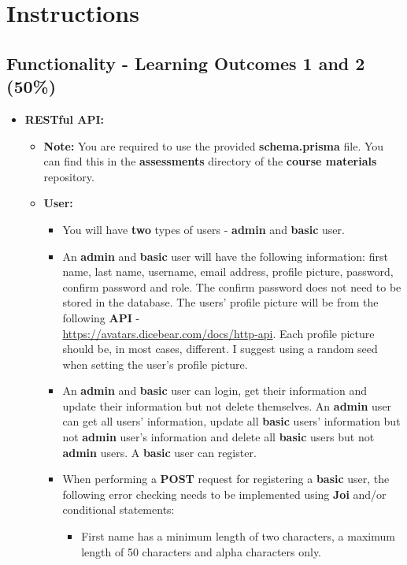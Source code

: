 \documentclass{article}
\begin{document}
\section*{Instructions}

\subsection*{Functionality - Learning Outcomes 1 and 2 (50\%)}
\begin{itemize} 

\item \textbf{RESTful API:}
	\begin{itemize}
		\item \textbf{Note:} You are required to use the provided \textbf{schema.prisma} file. You can find this in the \textbf{assessments} directory of the \textbf{course materials} repository.
		\item \textbf{User:}
		\begin{itemize}
			\item You will have \textbf{two} types of users - \textbf{admin} and \textbf{basic} user.
			\item An \textbf{admin} and \textbf{basic} user will have the following information: first name, last name, username, email address, profile picture, password, confirm password and role. The confirm password does not need to be stored in the database. The users' profile picture will be from the following \textbf{API} - \\ \href{https://avatars.dicebear.com/docs/http-api}{https://avatars.dicebear.com/docs/http-api}. Each profile picture should be, in most cases, different. I suggest using a random seed when setting the user's profile picture.
			\item An \textbf{admin} and \textbf{basic} user can login, get their information and update their information but not delete themselves. An \textbf{admin} user can get all users' information, update all \textbf{basic} users' information but not \textbf{admin} user's information and delete all \textbf{basic} users but not \textbf{admin} users. A \textbf{basic} user can register.
			\item When performing a \textbf{POST} request for registering a \textbf{basic} user, the following error checking needs to be implemented using \textbf{Joi} and/or conditional statements:
			\begin{itemize}
				\item First name has a minimum length of two characters, a maximum length of 50 characters and alpha characters only.

\end{itemize}
\end{itemize}
\end{itemize}
\end{itemize}
\end{document}
